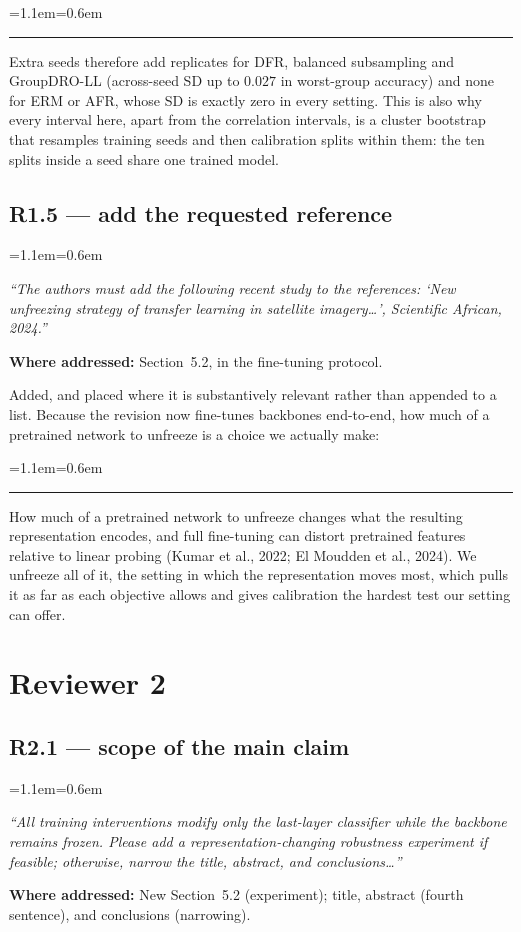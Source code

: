\documentclass[11pt,a4paper]{article}
\newenvironment{reviewer}
  {\begin{list}{}{\leftmargin=1.1em\rightmargin=0.6em}\item[]\itshape\color{revgrey}\small}
  {\end{list}}
\newenvironment{revised}
  {\begin{list}{}{\leftmargin=1.1em\rightmargin=0.6em}\item[]%
   \color{black}\small\hspace{-1.1em}\textcolor{quoterule}{\rule[-0.4ex]{2pt}{1.05em}}\hspace{0.5em}\ignorespaces}
  {\end{list}}
\newcommand{\where}[1]{{\textbf{Where addressed:} #1\par}}
\newcommand{\rpoint}[2]{\subsection*{#1 --- #2}}
\begin{document}
\begin{revised}
Extra seeds therefore add replicates for DFR, balanced subsampling and GroupDRO-LL
(across-seed SD up to $0.027$ in worst-group accuracy) and none for ERM or AFR, whose SD is exactly
zero in every setting. This is also why every interval here, apart from the correlation intervals,
is a cluster bootstrap that resamples training seeds and then calibration splits within them: the
ten splits inside a seed share one trained model.
\end{revised}

\rpoint{R1.5}{add the requested reference}

\begin{reviewer}
``The authors must add the following recent study to the references: `New unfreezing strategy of
transfer learning in satellite imagery\ldots', Scientific African, 2024.''
\end{reviewer}

\where{Section~5.2, in the fine-tuning protocol.}

Added, and placed where it is substantively relevant rather than appended to a list. Because the
revision now fine-tunes backbones end-to-end, how much of a pretrained network to unfreeze is a
choice we actually make:

\begin{revised}
How much of a pretrained network to unfreeze changes what the resulting representation
encodes, and full fine-tuning can distort pretrained features relative to linear probing (Kumar et
al., 2022; El Moudden et al., 2024). We unfreeze all of it, the setting in which the representation
moves most, which pulls it as far as each objective allows and gives calibration the hardest test
our setting can offer.
\end{revised}

\section*{Reviewer 2}

\rpoint{R2.1}{scope of the main claim}

\begin{reviewer}
``All training interventions modify only the last-layer classifier while the backbone remains
frozen. Please add a representation-changing robustness experiment if feasible; otherwise, narrow
the title, abstract, and conclusions\ldots''
\end{reviewer}

\where{New Section~5.2 (experiment); title, abstract (fourth sentence), and conclusions
(narrowing).}
\end{document}
